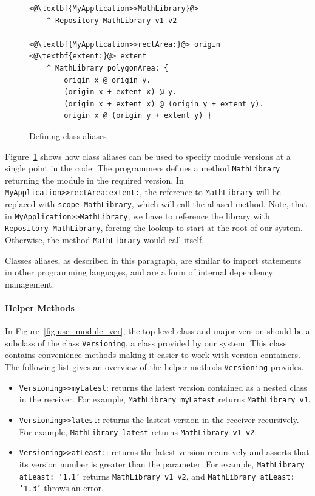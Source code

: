 \begin{figure}[!htp]
\begin{lstlisting}
<@\textbf{MyApplication>>MathLibrary}@>
    ^ Repository MathLibrary v1 v2

<@\textbf{MyApplication>>rectArea:}@> origin <@\textbf{extent:}@> extent
    ^ MathLibrary polygonArea: { 
        origin x @ origin y.
        (origin x + extent x) @ y.
        (origin x + extent x) @ (origin y + extent y).
        origin x @ (origin y + extent y) }
\end{lstlisting}
\caption{Defining class aliases}
\label{fig:use_alias}
\end{figure}

Figure~\ref{fig:use_alias} shows how class aliases can be used to specify module versions at a single point in the code. The programmers defines a method \texttt{MathLibrary} returning the module in the required version. In \texttt{MyApplication>>rectArea:extent:}, the reference to \texttt{MathLibrary} will be replaced with \texttt{scope MathLibrary}, which will call the aliased method. Note, that in \texttt{MyApplication>>MathLibrary}, we have to reference the library with \texttt{Repository MathLibrary}, forcing the lookup to start at the root of our system. Otherwise, the method \texttt{MathLibrary} would call itself.

Classes aliases, as described in this paragraph, are similar to import statements in other programming languages, and are a form of internal dependency management.

\paragraph{Helper Methods}
In Figure~\ref{fig:use_module_ver}, the top-level class and major version should be a subclass of the class \texttt{Versioning}, a class provided by our system. This class contains convenience methods making it easier to work with version containers. The following list gives an overview of the helper methods \texttt{Versioning} provides.

\begin{itemize}
	\item \texttt{Versioning>>myLatest}: returns the latest version contained as a nested class in the receiver. For example, \texttt{MathLibrary myLatest} returns \texttt{MathLibrary v1}.
	\item \texttt{Versioning>>latest}: returns the lastest version in the receiver recursively. For example, \texttt{MathLibrary latest} returns \texttt{MathLibrary v1 v2}.
	\item \texttt{Versioning>>atLeast:}: returns the latest version recursively and asserts that its version number is greater than the parameter. For example, \texttt{MathLibrary atLeast: '1.1'} returns \texttt{MathLibrary v1 v2}, and \texttt{MathLibrary atLeast: '1.3'} throws an error.
\end{itemize}

